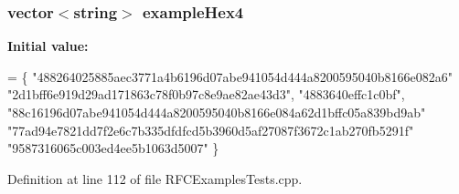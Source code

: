 \subsubsection[{example\+Hex4}]{\setlength{\rightskip}{0pt plus 5cm}vector$<$string$>$ example\+Hex4}\label{RFCExamplesTests_8cpp_a8f2c55ac0f2af172368e6ceabf00d834}
{\bfseries Initial value\+:}
\begin{DoxyCode}
= \{
  \textcolor{stringliteral}{"488264025885aec3771a4b6196d07abe941054d444a8200595040b8166e082a6"}
  \textcolor{stringliteral}{"2d1bff6e919d29ad171863c78f0b97c8e9ae82ae43d3"},
  \textcolor{stringliteral}{"4883640effc1c0bf"},
  \textcolor{stringliteral}{"88c16196d07abe941054d444a8200595040b8166e084a62d1bffc05a839bd9ab"}
  \textcolor{stringliteral}{"77ad94e7821dd7f2e6c7b335dfdfcd5b3960d5af27087f3672c1ab270fb5291f"}
  \textcolor{stringliteral}{"9587316065c003ed4ee5b1063d5007"}
\}
\end{DoxyCode}


Definition at line 112 of file R\+F\+C\+Examples\+Tests.\+cpp.

